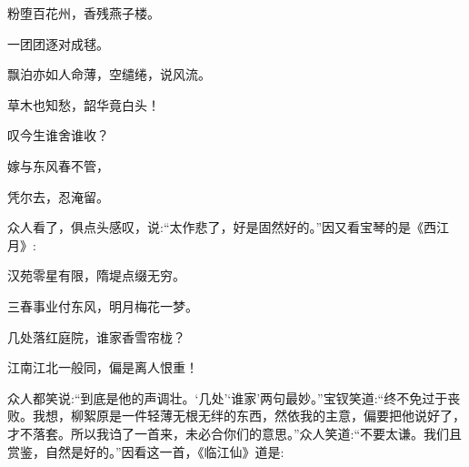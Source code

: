 \begin{poem}
    \begin{pl}粉堕百花州，香残燕子楼。\end{pl}

    \begin{pl}一团团逐对成毬。\end{pl}

    \begin{pl}飘泊亦如人命薄，空缱绻，说风流。\end{pl}

    \begin{pl}草木也知愁，韶华竟白头！\end{pl}

    \begin{pl}叹今生谁舍谁收？\end{pl}

    \begin{pl}嫁与东风春不管，\end{pl}

    \begin{pl}凭尔去，忍淹留。\end{pl}

\end{poem}


\begin{parag}
    众人看了，俱点头感叹，说:“太作悲了，好是固然好的。”因又看宝琴的是《西江月》:
\end{parag}


\begin{poem}
    \begin{pl}汉苑零星有限，隋堤点缀无穷。\end{pl}

    \begin{pl}三春事业付东风，明月梅花一梦。\end{pl}

    \begin{pl}几处落红庭院，谁家香雪帘栊？\end{pl}

    \begin{pl}江南江北一般同，偏是离人恨重！\end{pl}

\end{poem}


\begin{parag}
    众人都笑说:“到底是他的声调壮。‘几处’‘谁家’两句最妙。”宝钗笑道:“终不免过于丧败。我想，柳絮原是一件轻薄无根无绊的东西，然依我的主意，偏要把他说好了，才不落套。所以我诌了一首来，未必合你们的意思。”众人笑道:“不要太谦。我们且赏鉴，自然是好的。”因看这一首，《临江仙》道是:
\end{parag}


